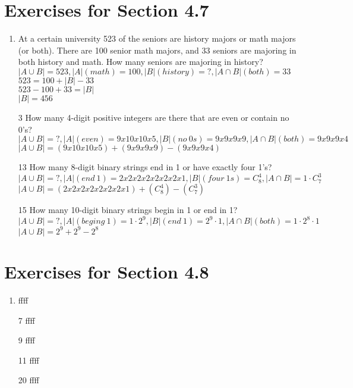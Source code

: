 \documentclass[12pt]{article}
\begin{document}
\section*{Exercises for Section 4.7}
\begin{enumerate}
    \item At a certain university 523 of the seniors are history majors or math majors (or both). There are 100 senior math majors, and 33 seniors are majoring in both history and math. How many seniors are majoring in history?\\
	$|A\cup B| = 523, |A|(math) = 100, |B|(history) = ?, |A\cap B|(both) = 33$\\
	$523 = 100 + |B| - 33$\\
	$523-100+33=|B|$\\
	$|B| = 456$
    \item [3] How many 4-digit positive integers are there that are even or contain no 0’s?\\
	$|A \cup B| = ?, |A|(even) = 9x10x10x5, |B|(no\ 0s) = 9x9x9x9, |A\cap B|(both) = 9x9x9x4$\\
	$|A\cup B| = (9x10x10x5) + (9x9x9x9) - (9x9x9x4)$
    \item [13] How many 8-digit binary strings end in 1 or have exactly four 1’s?\\
	$|A\cup B| = ?, |A|(end\ 1) = 2x2x2x2x2x2x2x1, |B|(four\ 1s)=C_{8}^4, |A\cap B| = 1\cdot C_7^3$\\
	$|A\cup B| = (2x2x2x2x2x2x2x1) + (C_8^4) - (C_7^3)$ 
    \item [15] How many 10-digit binary strings begin in 1 or end in 1?
	$|A \cup B| = ?, |A|(beging \ 1) = 1\cdot 2^9, |B|(end\ 1) = 2^9 \cdot 1, |A\cap B|(both) = 1\cdot 2^8 \cdot 1$\\
	$|A\cup B| = 2^9 + 2^9 - 2^8$
\end{enumerate}
\section*{Exercises for Section 4.8}
\begin{enumerate}
    \item ffff
    \item [7] ffff
    \item [9] ffff
    \item [11] ffff
    \item [20] ffff
\end{enumerate}
\end{document}

